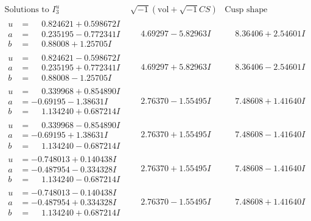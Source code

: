 \documentclass[1p]{elsarticle_modified}
\theoremstyle{definition}
\newcommand{\I}{\sqrt{-1}}
\begin{document}
$$\begin{array}{c|c|c}  
\text{Solutions to }I^u_{3}& \I (\text{vol} + \sqrt{-1}CS) & \text{Cusp shape}\\
 \hline 
\begin{aligned}
u &= \phantom{-}0.824621 + 0.598672 I \\
a &= \phantom{-}0.235195 - 0.772341 I \\
b &= \phantom{-}0.88008 + 1.25705 I\end{aligned}
 & \phantom{-}4.69297 - 5.82963 I & \phantom{-}8.36406 + 2.54601 I \\ \hline\begin{aligned}
u &= \phantom{-}0.824621 - 0.598672 I \\
a &= \phantom{-}0.235195 + 0.772341 I \\
b &= \phantom{-}0.88008 - 1.25705 I\end{aligned}
 & \phantom{-}4.69297 + 5.82963 I & \phantom{-}8.36406 - 2.54601 I \\ \hline\begin{aligned}
u &= \phantom{-}0.339968 + 0.854890 I \\
a &= -0.69195 - 1.38631 I \\
b &= \phantom{-}1.134240 + 0.687214 I\end{aligned}
 & \phantom{-}2.76370 - 1.55495 I & \phantom{-}7.48608 + 1.41640 I \\ \hline\begin{aligned}
u &= \phantom{-}0.339968 - 0.854890 I \\
a &= -0.69195 + 1.38631 I \\
b &= \phantom{-}1.134240 - 0.687214 I\end{aligned}
 & \phantom{-}2.76370 + 1.55495 I & \phantom{-}7.48608 - 1.41640 I \\ \hline\begin{aligned}
u &= -0.748013 + 0.140438 I \\
a &= -0.487954 - 0.334328 I \\
b &= \phantom{-}1.134240 - 0.687214 I\end{aligned}
 & \phantom{-}2.76370 + 1.55495 I & \phantom{-}7.48608 - 1.41640 I \\ \hline\begin{aligned}
u &= -0.748013 - 0.140438 I \\
a &= -0.487954 + 0.334328 I \\
b &= \phantom{-}1.134240 + 0.687214 I\end{aligned}
 & \phantom{-}2.76370 - 1.55495 I & \phantom{-}7.48608 + 1.41640 I \\ \hline\begin{aligned}

\end{aligned}
\end{array}$$
\end{document}
